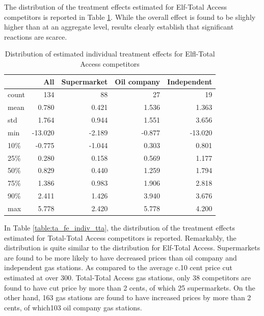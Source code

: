 \documentclass[11pt]{article}
\begin{document}
The distribution of the treatment effects estimated for Elf-Total Access competitors is reported in Table \ref{table:ta_fe_indiv_elf}. While the overall effect is found to be slighly higher than at an aggregate level, results clearly establish that significant reactions are scarce.

\begin{table}[h]
\centering
\caption{Distribution of estimated individual treatment effects for Elfl-Total Access competitors}
\begin{tabular}{lrrrr}
\toprule
{} &     All &    Supermarket &    Oil company &     Independent \\
\midrule
count & 134 & 88 & 27 &  19 \\
mean  &   0.780 &  0.421 &  1.536 &   1.363 \\
std   &   1.764 &  0.944 &  1.551 &   3.656 \\
min   & -13.020 & -2.189 & -0.877 & -13.020 \\
10\%   &  -0.775 & -1.044 &  0.303 &   0.801 \\
25\%   &   0.280 &  0.158 &  0.569 &   1.177 \\
50\%   &   0.829 &  0.440 &  1.259 &   1.794 \\
75\%   &   1.386 &  0.983 &  1.906 &   2.818 \\
90\%   &   2.411 &  1.426 &  3.940 &   3.676 \\
max   &   5.778 &  2.420 &  5.778 &   4.200 \\
\bottomrule
\end{tabular}
\label{table:ta_fe_indiv_elf}
\end{table}

In Table \ref{table:ta_fe_indiv_tta}, the distribution of the treatment effects estimated for Total-Total Access competitors is reported. Remarkably, the distribution is quite similar to the distribution for Elf-Total Access. Supermarkets are found to be more likely to have decreased prices than oil company and independent gas stations. As compared to the average c.10 cent price cut estimated at over 300. Total-Total Access gas stations, only 38 competitors are found to have cut price by more than 2 cents, of which 25 supermarkets. On the other hand, 163 gas stations are found to have increased prices by more than 2 cents, of which103 oil company gas stations.
\end{document}
